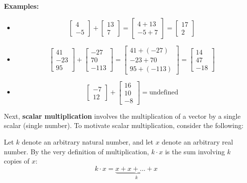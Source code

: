 \documentclass{article}
\begin{document}
\textbf{Examples:}
\begin{itemize}
\item 
\[\begin{bmatrix} 4 \\ -5 \end{bmatrix} + \begin{bmatrix} 13 \\ 7 \end{bmatrix} = \begin{bmatrix} 4 + 13 \\ -5 + 7 \end{bmatrix} = \begin{bmatrix} 17 \\ 2 \end{bmatrix}\]
\item 
\[\begin{bmatrix} 41 \\ -23 \\ 95 \end{bmatrix} + \begin{bmatrix} -27 \\ 70 \\ -113 \end{bmatrix} = \begin{bmatrix} 41 + (-27) \\ -23 + 70 \\ 95 + (-113) \end{bmatrix} = \begin{bmatrix} 14 \\ 47 \\ -18 \end{bmatrix}\]
\item 
\[\begin{bmatrix} -7 \\ 12 \end{bmatrix} + \begin{bmatrix} 16 \\ 10 \\ -8 \end{bmatrix} = \text{undefined}\]
\end{itemize}

Next, {\bf scalar multiplication} involves the multiplication of a vector by a single scalar (single number). To motivate scalar multiplication, consider the following:

Let \(k\) denote an arbitrary natural number, and let \(x\) denote an arbitrary real number. By the very definition of multiplication, \(k \cdot x\) is the sum involving \(k\) copies of \(x\): 
\[k \cdot x = \underbrace{x + x + ... + x}_k\]
\end{document}
